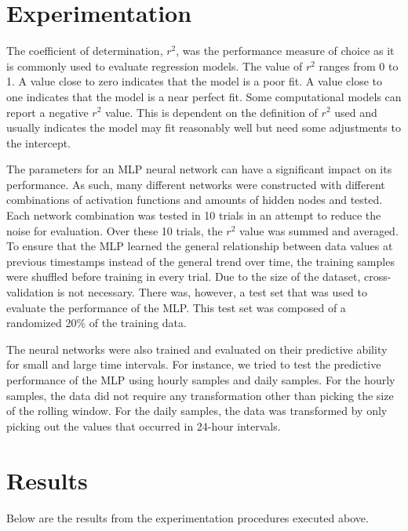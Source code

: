 \documentclass{article}
\begin{document}
\section{Experimentation}
The coefficient of determination, $r^2$, was the performance measure of choice as it is commonly used to evaluate regression models. The value of $r^2$ ranges from 0 to 1. A value close to zero indicates that the model is a poor fit. A value close to one indicates that the model is a near perfect fit. Some computational models can report a negative $r^2$ value. This is dependent on the definition of $r^2$ used and usually indicates the model may fit reasonably well but need some adjustments to the intercept.

The parameters for an MLP neural network can have a significant impact on its performance. As such, many different networks were constructed with different combinations of activation functions and amounts of hidden nodes and tested. Each network combination was tested in 10 trials in an attempt to reduce the noise for evaluation. Over these 10 trials, the $r^2$ value was summed and averaged. To ensure that the MLP learned the general relationship between data values at previous timestamps instead of the general trend over time, the training samples were shuffled before training in every trial. Due to the size of the dataset, cross-validation is not necessary. There was, however, a test set that was used to evaluate the performance of the MLP. This test set was composed of a randomized 20\% of the training data.

The neural networks were also trained and evaluated on their predictive ability for small and large time intervals. For instance, we tried to test the predictive performance of the MLP using hourly samples and daily samples. For the hourly samples, the data did not require any transformation other than picking the size of the rolling window. For the daily samples, the data was transformed by only picking out the values that occurred in 24-hour intervals.

\section{Results}

Below are the results from the experimentation procedures executed above.
\end{document}
